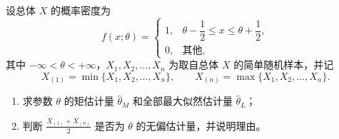 \begin{question}[index=22,points=12]
设总体 $X$ 的概率密度为
\[
f(x;\theta)=\begin{cases}
1,&\theta-\dfrac12\le x\le\theta+\dfrac12,\\[3pt]
0,&\text{其他},
\end{cases}
\]
其中 $-\infty<\theta<+\infty$，$X_1,X_2,\ldots,X_n$ 为取自总体 $X$ 的简单随机样本，并记
\[
X_{(1)}=\min\{X_1,X_2,\ldots,X_n\},\qquad X_{(n)}=\max\{X_1,X_2,\ldots,X_n\}.
\]
\begin{enumerate}[label=（\arabic*）,leftmargin=2.5em,labelsep=.4em,itemsep=3pt,topsep=3pt]
\item 求参数 $\theta$ 的矩估计量 $\hat\theta_M$ 和全部最大似然估计量 $\hat\theta_L$；
\item 判断 $\displaystyle\frac{X_{(1)}+X_{(n)}}2$ 是否为 $\theta$ 的无偏估计量，并说明理由。
\end{enumerate}
\end{question}
\WorkSpace
